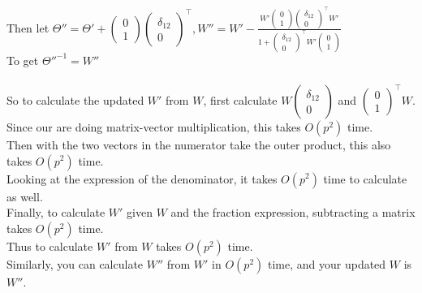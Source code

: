 \documentclass[11pt]{article}
\begin{document}
\begin{enumerate}[a)]
Then let $\Theta'' = \Theta' + \begin{pmatrix} 0 \\ 1 \end{pmatrix} \begin{pmatrix} \delta_{12} \\ 0 \end{pmatrix}^\top, W'' = W' - \frac{W' \begin{pmatrix} 0 \\ 1 \end{pmatrix} \begin{pmatrix} \delta_{12} \\ 0 \end{pmatrix}^\top W'}{1 + \begin{pmatrix} \delta_{12} \\ 0 \end{pmatrix}^\top W' \begin{pmatrix} 0 \\ 1 \end{pmatrix}}$\\
To get $\Theta''^{-1} = W''$\\
\\
So to calculate the updated $W'$ from $W$, first calculate $W \begin{pmatrix} \delta_{12} \\ 0 \end{pmatrix}$ and  $\begin{pmatrix} 0 \\ 1 \end{pmatrix}^\top W$. Since our are doing matrix-vector multiplication, this takes $O(p^2)$ time.\\
Then with the two vectors in the numerator take the outer product, this also takes $O(p^2)$ time.\\
Looking at the expression of the denominator, it takes $O(p^2)$ time to calculate as well.\\
Finally, to calculate $W'$ given $W$ and the fraction expression, subtracting a matrix takes $O(p^2)$ time.\\
Thus to calculate $W'$ from $W$ takes $O(p^2)$ time.\\
Similarly, you can calculate $W''$ from $W'$ in $O(p^2)$ time, and your updated $W$ is $W''$.


\end{enumerate}
\end{document}

